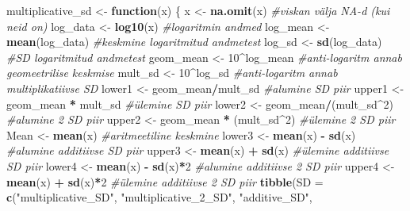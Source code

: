 \documentclass[]{book}
\newenvironment{Shaded}{\begin{snugshade}}{\end{snugshade}}
\newcommand{\KeywordTok}[1]{\textcolor[rgb]{0.13,0.29,0.53}{\textbf{#1}}}
\newcommand{\DataTypeTok}[1]{\textcolor[rgb]{0.13,0.29,0.53}{#1}}
\newcommand{\DecValTok}[1]{\textcolor[rgb]{0.00,0.00,0.81}{#1}}
\newcommand{\StringTok}[1]{\textcolor[rgb]{0.31,0.60,0.02}{#1}}
\newcommand{\CommentTok}[1]{\textcolor[rgb]{0.56,0.35,0.01}{\textit{#1}}}
\newcommand{\ControlFlowTok}[1]{\textcolor[rgb]{0.13,0.29,0.53}{\textbf{#1}}}
\newcommand{\OperatorTok}[1]{\textcolor[rgb]{0.81,0.36,0.00}{\textbf{#1}}}
\newcommand{\NormalTok}[1]{#1}
\begin{document}
\begin{Shaded}
\begin{Highlighting}[]
\NormalTok{multiplicative_sd <-}\StringTok{ }\ControlFlowTok{function}\NormalTok{(x) \{}
\NormalTok{  x <-}\StringTok{ }\KeywordTok{na.omit}\NormalTok{(x) }\CommentTok{#viskan välja NA-d (kui neid on)}
\NormalTok{  log_data <-}\StringTok{ }\KeywordTok{log10}\NormalTok{(x) }\CommentTok{#logaritmin andmed}
\NormalTok{  log_mean <-}\StringTok{ }\KeywordTok{mean}\NormalTok{(log_data) }\CommentTok{#keskmine logaritmitud andmetest}
\NormalTok{  log_sd <-}\StringTok{ }\KeywordTok{sd}\NormalTok{(log_data) }\CommentTok{#SD logaritmitud andmetest}
\NormalTok{  geom_mean <-}\StringTok{ }\DecValTok{10}\OperatorTok{^}\NormalTok{log_mean }\CommentTok{#anti-logaritm annab geomeetrilise keskmise}
\NormalTok{  mult_sd <-}\StringTok{ }\DecValTok{10}\OperatorTok{^}\NormalTok{log_sd }\CommentTok{#anti-logaritm annab multiplikatiivse SD}
\NormalTok{  lower1 <-}\StringTok{ }\NormalTok{geom_mean}\OperatorTok{/}\NormalTok{mult_sd }\CommentTok{#alumine SD piir}
\NormalTok{  upper1 <-}\StringTok{ }\NormalTok{geom_mean }\OperatorTok{*}\StringTok{ }\NormalTok{mult_sd }\CommentTok{#ülemine SD piir}
\NormalTok{  lower2 <-}\StringTok{ }\NormalTok{geom_mean}\OperatorTok{/}\NormalTok{(mult_sd}\OperatorTok{^}\DecValTok{2}\NormalTok{) }\CommentTok{#alumine 2 SD piir}
\NormalTok{  upper2 <-}\StringTok{ }\NormalTok{geom_mean }\OperatorTok{*}\StringTok{ }\NormalTok{(mult_sd}\OperatorTok{^}\DecValTok{2}\NormalTok{) }\CommentTok{#ülemine 2 SD piir}
\NormalTok{  Mean <-}\StringTok{ }\KeywordTok{mean}\NormalTok{(x) }\CommentTok{#aritmeetiline keskmine}
\NormalTok{  lower3 <-}\StringTok{ }\KeywordTok{mean}\NormalTok{(x) }\OperatorTok{-}\StringTok{ }\KeywordTok{sd}\NormalTok{(x) }\CommentTok{#alumine additiivse SD piir}
\NormalTok{  upper3 <-}\StringTok{ }\KeywordTok{mean}\NormalTok{(x) }\OperatorTok{+}\StringTok{ }\KeywordTok{sd}\NormalTok{(x) }\CommentTok{#ülemine additiivse SD piir}
\NormalTok{  lower4 <-}\StringTok{ }\KeywordTok{mean}\NormalTok{(x) }\OperatorTok{-}\StringTok{ }\KeywordTok{sd}\NormalTok{(x)}\OperatorTok{*}\DecValTok{2} \CommentTok{#alumine additiivse 2 SD piir}
\NormalTok{  upper4 <-}\StringTok{ }\KeywordTok{mean}\NormalTok{(x) }\OperatorTok{+}\StringTok{ }\KeywordTok{sd}\NormalTok{(x)}\OperatorTok{*}\DecValTok{2} \CommentTok{#ülemine additiivse 2 SD piir}
  \KeywordTok{tibble}\NormalTok{(}\DataTypeTok{SD =} \KeywordTok{c}\NormalTok{(}\StringTok{"multiplicative_SD"}\NormalTok{, }
                \StringTok{"multiplicative_2_SD"}\NormalTok{, }
                \StringTok{"additive_SD"}\NormalTok{, }

\end{Highlighting}
\end{Shaded}
\end{document}

